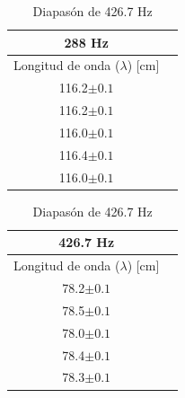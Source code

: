 \documentclass[10pt,a4paper]{article}
\begin{document}
\begin{table}[H]
    \centering
\begin{minipage}[t]{0.48\linewidth}\centering
\caption{Diapasón de 288 Hz}
\begin{tabular}{ c c }
\toprule
288 Hz   \\
\midrule
Longitud de onda ($\lambda$) [cm]     \\
116.2$\pm0.1$     \\
116.2$\pm0.1$     \\
116.0$\pm0.1$     \\
116.4$\pm0.1$     \\
116.0$\pm0.1$     \\
\bottomrule
\end{tabular}
\end{minipage}\hfill%
\begin{minipage}[t]{0.48\linewidth}\centering
\caption{Diapasón de 426.7 Hz}
\label{tab:The parameters 2 }
\begin{tabular}{ c c }
\toprule
426.7 Hz   \\
\midrule
Longitud de onda ($\lambda$) [cm]     \\
78.2$\pm0.1$     \\
78.5$\pm0.1$     \\
78.0$\pm0.1$     \\
78.4$\pm0.1$     \\
78.3$\pm0.1$     \\
\bottomrule
\end{tabular}
\end{minipage}
\end{table}
\end{document}
